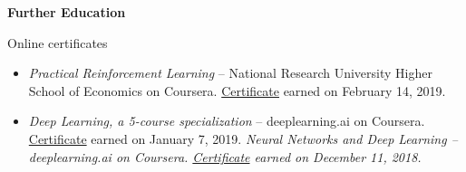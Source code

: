 
\hfil{\Large{\bf Further Education}}\hfil\\
\nameskip\break
\begin{rSection}{Online certificates}
  \begin{itemize}
    \item {\it Practical Reinforcement Learning} -- National Research University Higher School of Economics on Coursera. \href{https://www.coursera.org/account/accomplishments/verify/ZU822BH7BQW8}{Certificate} earned on February 14, 2019.
    \item{\it Deep Learning, a 5-course specialization} -- deeplearning.ai on Coursera. \href{https://coursera.org/share/47b1d9ff10e34c9d26c75f5f0914379b}{Certificate} earned on January 7, 2019.
    \subitem \it{Neural Networks and Deep Learning} -- deeplearning.ai on Coursera. \href{https://www.coursera.org/account/accomplishments/certificate/B4CSP8RC2BBJ}{Certificate} earned on December 11, 2018.
  \end{itemize}
\end{rSection}